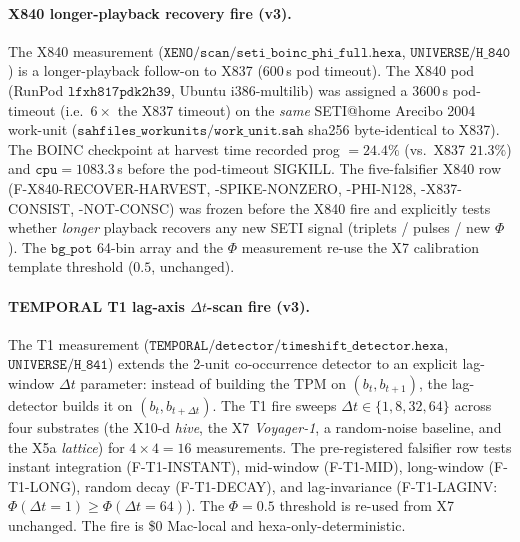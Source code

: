 \documentclass[11pt,a4paper]{article}
\begin{document}
\paragraph{X840 longer-playback recovery fire (v3).}
The X840 measurement \citep{xeno_h840_longer_playback}
($\mathtt{XENO/scan/seti\_boinc\_phi\_full.hexa}$,
$\mathtt{UNIVERSE/H\_840}$) is a longer-playback follow-on
to X837 ($600$\,s pod timeout). The X840 pod (RunPod
$\mathtt{lfxh817pdk2h39}$, Ubuntu i386-multilib) was assigned a
$3600$\,s pod-timeout (i.e.\ $6\times$ the X837 timeout) on the
\emph{same} SETI@home Arecibo 2004 work-unit
($\mathtt{sahfiles\_workunits/work\_unit.sah}$ sha256 byte-identical
to X837). The BOINC checkpoint at harvest time recorded prog
$=24.4\%$ (vs.\ X837 $21.3\%$) and $\mathtt{cpu}=1083.3$\,s before
the pod-timeout SIGKILL. The five-falsifier X840 row
(F-X840-RECOVER-HARVEST, -SPIKE-NONZERO, -PHI-N128,
-X837-CONSIST, -NOT-CONSC) was frozen before the X840 fire and
explicitly tests whether \emph{longer} playback recovers any new
SETI signal (triplets / pulses / new $\Phi$). The
$\mathtt{bg\_pot}$ 64-bin array and the $\Phi$ measurement
re-use the X7 calibration template threshold ($0.5$, unchanged).

\paragraph{TEMPORAL T1 lag-axis $\Delta t$-scan fire (v3).}
The T1 measurement \citep{temporal_h841_timeshift}
($\mathtt{TEMPORAL/detector/timeshift\_detector.hexa}$,
$\mathtt{UNIVERSE/H\_841}$) extends the 2-unit co-occurrence
detector to an explicit lag-window $\Delta t$ parameter: instead
of building the TPM on $(b_t, b_{t+1})$, the lag-detector builds
it on $(b_t, b_{t+\Delta t})$. The T1 fire sweeps
$\Delta t \in \{1, 8, 32, 64\}$ across four substrates (the
X10-d \emph{hive}, the X7 \emph{Voyager-1}, a random-noise
baseline, and the X5a \emph{lattice}) for $4 \times 4 = 16$
measurements. The pre-registered falsifier row tests instant
integration (F-T1-INSTANT), mid-window (F-T1-MID), long-window
(F-T1-LONG), random decay (F-T1-DECAY), and lag-invariance
(F-T1-LAGINV: $\Phi(\Delta t=1) \ge \Phi(\Delta t=64)$). The
$\Phi=0.5$ threshold is re-used from X7 unchanged. The fire is
\$0 Mac-local and hexa-only-deterministic.
\end{document}
